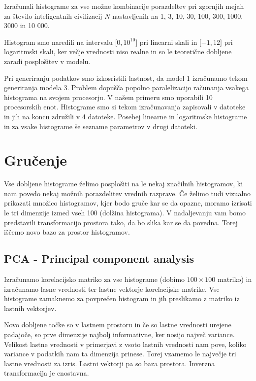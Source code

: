 \documentclass[a4paper]{IEEEtran}
\begin{document}
Izračunali histograme za vse možne kombinacije porazdeltev
pri zgornjih mejah za število inteligentnih civilizacij $N$ nastavljenih na 1, 3, 10, 30, 100, 300, 1000, 3000 in 10 000.

Histogram smo naredili na intervalu $\lbrack 0, 10^10\rbrack$ pri linearni skali in $\lbrack -1, 12\rbrack$ pri logaritmski skali, ker večje vrednosti niso realne in so le teoretične dobljene zaradi posplošitev v modelu.

Pri generiranju podatkov smo izkosristili lastnost, da model 1 izračunamo tekom generiranja modela 3. Problem dopušča popolno paralelizacijo računanja vsakega histograma na svojem procesorju. V našem primeru smo uporabili 10 procesorskih enot. Histograme smo si tekom izračunavanja zapisovali v datoteke in jih na koncu združili v 4 datoteke. Posebej linearne in logaritmske histograme in za vsake histograme še sezname parametrov v drugi datoteki.

\section{Gručenje}

Vse dobljene histograme želimo posplošiti na le nekaj značilnih histogramov, ki nam povedo nekaj možnih porazdelitev vrednih razprave. Če želimo tudi vizualno prikazati množico histogramov, kjer bodo gruče kar se da opazne, moramo izrisati le tri dimenzije izmed vseh 100 (dolžina histograma). V nadaljevanju vam bomo predstavili transformacijo prostora tako, da bo slika kar se da povedna. Torej iščemo novo bazo za prostor histogramov.

\subsection{PCA - Principal component analysis}

Izračunamo korelacijsko matriko za vse histograme (dobimo $100\times100$ matriko) in izračunamo lasne vrednosti ter lastne vektorje korelacijske matrike. Vse histograme zamaknemo za povprečen histogram in jih preslikamo z matriko iz lastnih vektorjev.

Novo dobljene točke so v lastnem prostoru in če so lastne vrednosti urejene padajoče, so prve dimenzije najbolj informativne, ker nosijo največ variance. Velikost lastne vrednosti v primerjavi z vsoto lastnih vrednosti nam pove, koliko variance v podatkih nam ta dimenzija prinese. Torej vzamemo le največje tri lastne vrednosti za izris. Lastni vektorji pa so baza prostora. Inverzna transformacija je enostavna.
\end{document}
